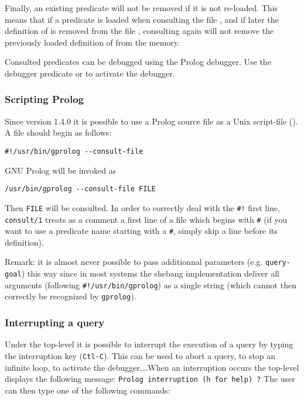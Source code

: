 
Finally, an existing predicate will not be removed if it is not re-loaded.
This means that if a predicate  is loaded when consulting
the file , and if later the definition of
 is removed from the file , consulting
 again will not remove the previously loaded definition
of  from the memory.

Consulted predicates can be debugged using the Prolog debugger. Use the
debugger predicate  or   to activate the debugger.


\subsubsection{Scripting Prolog}
\label{Scripting-Prolog}
Since version 1.4.0 it is possible to use a Prolog source file as a Unix
script-file (). A  file should begin as follows:

\begin{Code}
\begin{verbatim}
#!/usr/bin/gprolog --consult-file
\end{verbatim}
\end{Code}

GNU Prolog will be invoked as

\begin{Code}
\begin{verbatim}
/usr/bin/gprolog --consult-file FILE
\end{verbatim}
\end{Code}

Then \texttt{FILE} will be consulted. In order to correctly deal with the
\texttt{\#!} first line, \texttt{consult/1} treats as a comment a first line
of a file which begins with \texttt{\#} (if you want to use a predicate name
starting with a \texttt{\#}, simply skip a line before its definition).


Remark: it is almost never possible to pass additionnal parameters
(e.g. \texttt{query-goal}) this way since in most systems 
the shebang implementation deliver all arguments (following
\texttt{\#!/usr/bin/gprolog}) as a single string (which cannot then correctly
be recognized by \texttt{gprolog}).

\subsubsection{Interrupting a query}
\label{Interrupting-a-query}
Under the top-level it is possible to interrupt the execution of a query by
typing the interruption key (\texttt{Ctl-C}). This can be used to abort a
query, to stop an infinite loop, to activate the debugger,\ldots When an
interruption occurs the top-level displays the following message:
\texttt{Prolog interruption (h for help)~?} The user can then type one of
the following commands:

